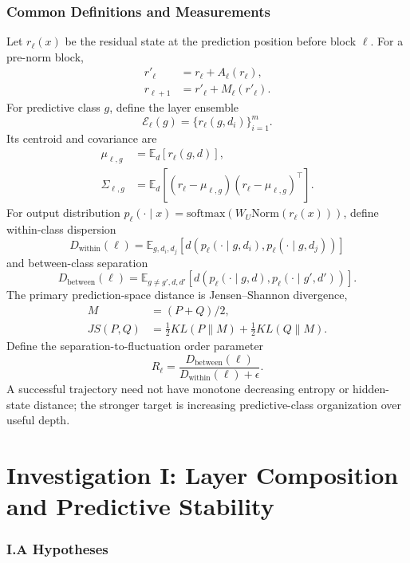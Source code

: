 \documentclass[10pt]{article}
\begin{document}
\section{Common Definitions and Measurements}
Let $r_\ell(x)$ be the residual state at the prediction position before block $\ell$. For a pre-norm block,
\begin{align}
r'_\ell &= r_\ell + A_\ell(r_\ell),\\
r_{\ell+1} &= r'_\ell + M_\ell(r'_\ell).
\end{align}
For predictive class $g$, define the layer ensemble
\begin{equation}\mathcal{E}_\ell(g)=\{r_\ell(g,d_i)\}_{i=1}^{m}.\end{equation}
Its centroid and covariance are
\begin{align}
\mu_{\ell,g}&=\mathbb{E}_d[r_\ell(g,d)],\\
\Sigma_{\ell,g}&=\mathbb{E}_d[(r_\ell-\mu_{\ell,g})(r_\ell-\mu_{\ell,g})^\top].
\end{align}
For output distribution $p_\ell(\cdot\mid x)=\mathrm{softmax}(W_U\mathrm{Norm}(r_\ell(x)))$, define within-class dispersion
\begin{equation}
D_{\mathrm{within}}(\ell)=\mathbb{E}_{g,d_i,d_j}[d(p_\ell(\cdot\mid g,d_i),p_\ell(\cdot\mid g,d_j))]
\end{equation}
and between-class separation
\begin{equation}
D_{\mathrm{between}}(\ell)=\mathbb{E}_{g\neq g',d,d'}[d(p_\ell(\cdot\mid g,d),p_\ell(\cdot\mid g',d'))].
\end{equation}
The primary prediction-space distance is Jensen--Shannon divergence,
\begin{align}
M&=(P+Q)/2,\\
JS(P,Q)&=\tfrac12 KL(P\|M)+\tfrac12 KL(Q\|M).
\end{align}
Define the separation-to-fluctuation order parameter
\begin{equation}R_\ell=\frac{D_{\mathrm{between}}(\ell)}{D_{\mathrm{within}}(\ell)+\epsilon}.\end{equation}
A successful trajectory need not have monotone decreasing entropy or hidden-state distance; the stronger target is increasing predictive-class organization over useful depth.

\part{Investigation I: Layer Composition and Predictive Stability}
\section{I.A Hypotheses}
\end{document}
